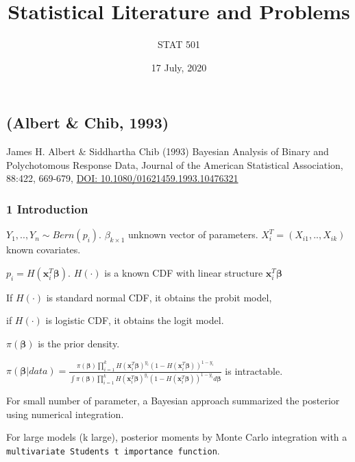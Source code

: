 \documentclass[
]{article}
\title{Statistical Literature and Problems}
\subtitle{STAT 501}
\author{}
\date{\vspace{-2.5em}17 July, 2020}
\begin{document}
\maketitle

\hypertarget{section}{%
\section{}\label{section}}

\hypertarget{albert-chib-1993}{%
\subsection{(Albert \& Chib, 1993)}\label{albert-chib-1993}}

James H. Albert \& Siddhartha Chib (1993) Bayesian Analysis of Binary
and Polychotomous Response Data, Journal of the American Statistical
Association, 88:422, 669-679,
\href{https://doi.org/10.1080/01621459.1993.10476321}{DOI:
10.1080/01621459.1993.10476321}

\hypertarget{introduction}{%
\subsubsection{1 Introduction}\label{introduction}}

\(Y_1,..,Y_n\sim Bern(p_i)\). \(\beta_{k\times1}\) unknown vector of
parameters. \(X_i^T=(X_{i1},..,X_{ik})\) known covariates.

\(p_i=H(\mathbf{x}_i^T\boldsymbol{\beta})\). \(H(\cdot)\) is a known CDF
with linear structure \(\mathbf{x}_i^T\boldsymbol{\beta}\)

If \(H(\cdot)\) is standard normal CDF, it obtains the probit model,

if \(H(\cdot)\) is logistic CDF, it obtains the logit model.

\(\pi(\boldsymbol{\beta})\) is the prior density.

\(\pi(\boldsymbol{\beta}|data) = \frac{\pi(\boldsymbol{\beta})\prod_{i=1}^{k}H (\mathbf{x}_i^T\boldsymbol{\beta})^{y_i}(1-H(\mathbf{x}_i^T\boldsymbol{\beta}))^{1-y_i}}{\int\pi(\boldsymbol{\beta})\prod_{i=1}^{k}H (\mathbf{x}_i^T\boldsymbol{\beta})^{y_i}(1-H(\mathbf{x}_i^T\boldsymbol{\beta}))^{1-y_i}d\boldsymbol{\beta}}\)
is intractable.

For small number of parameter, a Bayesian approach summarized the
posterior using numerical integration.

For large models (k large), posterior moments by Monte Carlo integration
with a
\texttt{multivariate\ Student\textquotesingle{}s\ t\ importance\ function}.
\end{document}

